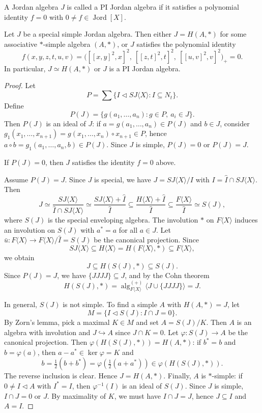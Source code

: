 \documentclass{article}
\begin{document}
\begin{definition}
A Jordan algebra $J$ is called a PI Jordan algebra if it satisfies a polynomial identity $f=0$ with $0 \neq f \in \operatorname{Jord}[X]$.
\end{definition}

\begin{theorem}
Let $J$ be a special simple Jordan algebra. Then either $J = H(A, *)$ for some associative $*$-simple algebra $(A, *)$, or $J$ satisfies the polynomial identity
\[
f(x, y, z, t, u, v) = \big( [[x, y]^2, x]^2,\ [[z, t]^2, t]^2,\ [[u, v]^2, v]^2 \big)_+ = 0.
\]
In particular, $J \simeq H(A, *)$ or $J$ is a PI Jordan algebra.
\end{theorem}

\begin{proof}
Let
\[
P = \sum \{ I \triangleleft SJ\langle X \rangle : I \subseteq N_t \}.
\]
Define
\[
P(J) = \{ g(a_1, \ldots, a_n) : g \in P,\ a_i \in J \}.
\]
Then $P(J)$ is an ideal of $J$: if $a = g(a_1, \ldots, a_n) \in P(J)$ and $b \in J$, consider
$g_1(x_1, \ldots, x_{n+1}) = g(x_1, \ldots, x_n) \circ x_{n+1} \in P$, hence
$a \circ b = g_1(a_1, \ldots, a_n, b) \in P(J)$.
Since $J$ is simple, $P(J) = 0$ or $P(J) = J$.

If $P(J)=0$, then $J$ satisfies the identity $f=0$ above.

Assume $P(J)=J$. Since $J$ is special, we have $J = SJ\langle X \rangle / I$ with $I = \hat{I} \cap SJ\langle X \rangle$. Then
\[
J \simeq \frac{SJ\langle X \rangle}{\hat{I} \cap SJ\langle X \rangle}
\simeq \frac{SJ\langle X \rangle + \hat{I}}{\hat{I}}
\subseteq \frac{H\langle X \rangle + \hat{I}}{\hat{I}}
\subseteq \frac{F\langle X \rangle}{\hat{I}} \simeq S(J),
\]
where $S(J)$ is the special enveloping algebra.
The involution $*$ on $F\langle X \rangle$ induces an involution on $S(J)$ with $a^* = a$ for all $a \in J$.
Let $\bar{u}: F\langle X \rangle \to F\langle X \rangle/\hat{I} = S(J)$ be the canonical projection. Since
\[
SJ\langle X \rangle \subseteq H\langle X \rangle = H(F\langle X \rangle, *) \subseteq F\langle X \rangle,
\]
we obtain
\[
J \subseteq H(S(J), *) \subseteq S(J).
\]
Since $P(J)=J$, we have $\{JJJJ\} \subseteq J$, and by the Cohn theorem
\[
H(S(J), *) = \operatorname{alg}_{F\langle X \rangle}^{(+)} \langle J \cup \{JJJJ\} \rangle = J.
\]

In general, $S(J)$ is not simple. To find a simple $A$ with $H(A, *) = J$, let
\[
M = \{ I \triangleleft S(J) : I \cap J = 0 \}.
\]
By Zorn's lemma, pick a maximal $K \in M$ and set $A = S(J)/K$. Then $A$ is an algebra with involution and $J \hookrightarrow A$ since $J \cap K = 0$.
Let $\varphi: S(J) \to A$ be the canonical projection. Then $\varphi(H(S(J), *)) = H(A, *)$:
if $b^* = b$ and $b=\varphi(a)$, then $a-a^* \in \ker \varphi = K$ and
\[
b = \tfrac{1}{2}(b+b^*) = \varphi\!\left(\tfrac{1}{2}(a+a^*)\right) \in \varphi(H(S(J), *)).
\]
The reverse inclusion is clear. Hence $J = H(A, *)$.
Finally, $A$ is $*$-simple: if $0 \neq I \triangleleft A$ with $I^* = I$, then $\varphi^{-1}(I)$ is an ideal of $S(J)$.
Since $J$ is simple, $I \cap J = 0$ or $J$. By maximality of $K$, we must have $I \cap J = J$, hence $J \subseteq I$ and $A=I$.
\end{proof}
\end{document}
